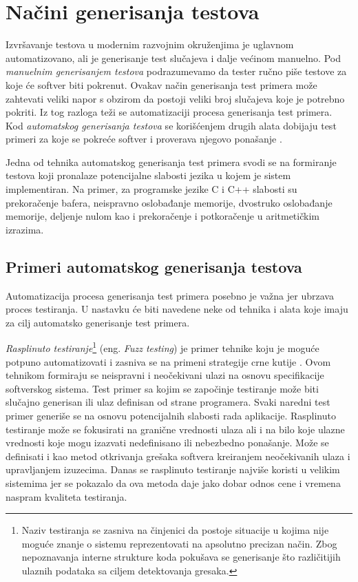 \documentclass[12pt,oneside]{memoir}
\begin{document}
\section{Načini generisanja testova} \label{broj5}

Izvršavanje testova u modernim razvojnim okruženjima je uglavnom automatizovano, ali je generisanje test slučajeva i dalje većinom manuelno. Pod \emph{manuelnim generisanjem testova} podrazumevamo da tester ručno piše testove za koje će softver biti pokrenut. Ovakav način generisanja test primera može zahtevati veliki napor s obzirom da postoji veliki broj slučajeva koje je potrebno pokriti. Iz tog razloga teži se automatizaciji procesa generisanja test primera. Kod \emph{automatskog generisanja testova} se korišćenjem drugih alata dobijaju test primeri za koje se pokreće softver i proverava njegovo ponašanje \cite{AutomatedTestGeneration}. \par
Jedna od tehnika automatskog generisanja test primera svodi se na formiranje testova koji pronalaze potencijalne slabosti jezika u kojem je sistem implementiran.
Na primer, za programske jezike C i C++ slabosti su prekoračenje bafera, neispravno oslobađanje memorije, dvostruko oslobađanje memorije, deljenje nulom kao i prekoračenje i potkoračenje u aritmetičkim izrazima.


\subsection{Primeri automatskog generisanja testova}
Automatizacija procesa generisanja test primera posebno je važna jer ubrzava proces testiranja. U nastavku će biti navedene neke od tehnika i alata koje imaju za cilj automatsko generisanje test primera. 


\emph{Rasplinuto testiranje}\footnote{Naziv testiranja se zasniva na činjenici da postoje situacije u kojima nije moguće znanje o sistemu reprezentovati na apsolutno precizan način. Zbog nepoznavanja interne strukture koda pokušava se generisanje što različitijih ulaznih podataka sa ciljem detektovanja gresaka.} (eng. \textit{Fuzz testing}) je primer tehnike koju je moguće potpuno automatizovati i zasniva se na primeni strategije crne kutije \cite{FuzzTestingForDummies}. 
Ovom tehnikom formiraju se neispravni i neočekivani ulazi na osnovu specifikacije softverskog sistema.
Test primer sa kojim se započinje testiranje može biti slučajno generisan ili ulaz definisan od strane programera. Svaki naredni test primer generiše se na osnovu potencijalnih slabosti rada aplikacije. Rasplinuto testiranje može se fokusirati na granične vrednosti ulaza ali i na bilo koje ulazne vrednosti koje mogu izazvati nedefinisano ili nebezbedno ponašanje. Može se definisati i kao metod otkrivanja grešaka softvera kreiranjem neočekivanih ulaza i upravljanjem izuzecima. Danas se rasplinuto testiranje najviše koristi u velikim sistemima jer se pokazalo da ova metoda daje jako dobar odnos cene i vremena naspram kvaliteta testiranja. 
\par
\end{document}

